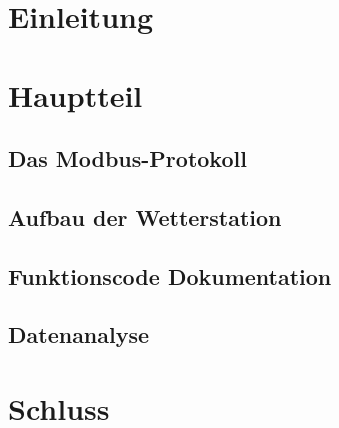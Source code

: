 \documentclass[11pt,a4paper,oneside,ngerman,appendixprefix=true,listof=chapterentry]{report}
\begin{document}


\tableofcontents
\listoffigures
\listoftables
\part{Einleitung}

\part{Hauptteil}
\chapter{Das Modbus-Protokoll}
\chapter{Aufbau der Wetterstation}

\chapter{Funktionscode Dokumentation}
\chapter{Datenanalyse}
\part{Schluss}


 
 
\end{document}
